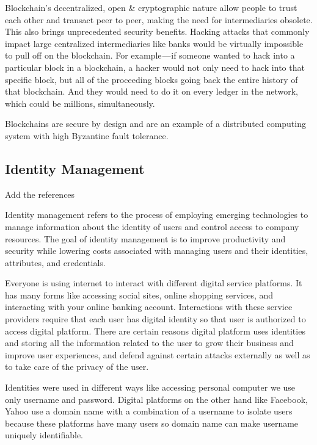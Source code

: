 Blockchain’s decentralized, open & cryptographic nature allow people to trust each other and transact peer to peer, making the need for intermediaries obsolete. This also brings unprecedented security benefits. Hacking attacks that commonly impact large centralized intermediaries like banks would be virtually impossible to pull off on the blockchain. For example — if someone wanted to hack into a particular block in a blockchain, a hacker would not only need to hack into that specific block, but all of the proceeding blocks going back the entire history of that blockchain. And they would need to do it on every ledger in the network, which could be millions, simultaneously.

Blockchains are secure by design and are an example of a distributed computing system with high Byzantine fault tolerance.


\subsection{Identity Management}
\begin{notation}
  Add the references
\end{notation}

Identity management refers to the process of employing emerging technologies to manage information about the identity of users and control access to company resources\citep{IdentityManagement}. The goal of identity management is to improve productivity and security while lowering costs associated with managing users and their identities, attributes, and credentials.

Everyone is using internet to interact with different digital service platforms.
It has many forms like accessing social sites, online shopping services, and interacting with your online banking account. Interactions with these service providers require that each user has digital identity so that user is authorized to access digital platform. There are certain reasons digital platform uses identities and storing all the information related to the user to grow their business and improve user experiences, and defend against certain attacks externally as well as to take care of the privacy of the user.

Identities were used in different ways like accessing personal computer we use only username and password. Digital platforms on the other hand like Facebook, Yahoo use a domain name with a combination of a username to isolate users because these platforms have many users so domain name can make username uniquely identifiable\citep{gondor2016distributed}.


